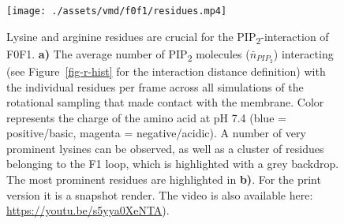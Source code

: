 \documentclass[
  twocolumn]{biophys-new-mod}
\begin{document}
\begin{figure}

\begin{minipage}[t]{\linewidth}

{\centering 


}

\subcaption{\label{fig-f0f1-ri-npip}~}
\end{minipage}%
\newline
\begin{minipage}[t]{\linewidth}

{\centering 

\texttt{[image: ./assets/vmd/f0f1/residues.mp4]}

}

\subcaption{\label{fig-f1f1-residues}~}
\end{minipage}%

\caption{\label{fig-f0f1-residues}Lysine and arginine residues are
crucial for the PIP\textsubscript{2}-interaction of F0F1. \textbf{a)}
The average number of PIP\textsubscript{2} molecules
(\(\bar n_{PIP_2}\)) interacting (see Figure~\ref{fig-r-hist} for the
interaction distance definition) with the individual residues per frame
across all simulations of the rotational sampling that made contact with
the membrane. Color represents the charge of the amino acid at pH 7.4
(blue = positive/basic, magenta = negative/acidic). A number of very
prominent lysines can be observed, as well as a cluster of residues
belonging to the F1 loop, which is highlighted with a grey backdrop. The
most prominent residues are highlighted in \textbf{b)}. For the print
version it is a snapshot render. The video is also available here:
\url{https://youtu.be/s5yya0XeNTA}).}

\end{figure}
\end{document}
